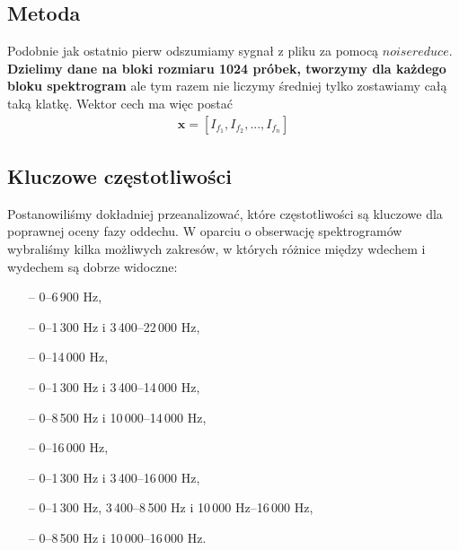 \documentclass[polish]{article}
\begin{document}
\subsection{Metoda}
Podobnie jak ostatnio pierw odszumiamy sygnał z pliku za pomocą $noisereduce$. \textbf{Dzielimy dane na bloki
rozmiaru 1024 próbek, tworzymy dla każdego bloku spektrogram} ale tym razem nie liczymy średniej tylko zostawiamy całą taką klatkę. Wektor cech ma więc postać 
\begin{gather*}
\boldsymbol{x} = [I_{f_1}, I_{f_2}, ..., I_{f_n}]
\end{gather*}
\subsection{Kluczowe częstotliwości}
Postanowiliśmy dokładniej przeanalizować, które częstotliwości są kluczowe dla poprawnej oceny fazy oddechu. W oparciu o obserwację spektrogramów wybraliśmy kilka możliwych zakresów, w których różnice między wdechem i wydechem są dobrze widoczne:
\begin{itemize}
	\setlength\itemsep{-0.25em}
	\item[--] 0--6\,900 \unit{Hz},
	\item[--] 0--1\,300 \unit{Hz} i 3\,400--22\,000 \unit{Hz},
	\item[--] 0--14\,000 \unit{Hz},
	\item[--] 0--1\,300 \unit{Hz} i 3\,400--14\,000 \unit{Hz},
	\item[--] 0--8\,500 \unit{Hz} i 10\,000--14\,000 \unit{Hz},
	\item[--] 0--16\,000 \unit{Hz},
	\item[--] 0--1\,300 \unit{Hz} i 3\,400--16\,000 \unit{Hz},
	\item[--] 0--1\,300 \unit{Hz}, 3\,400--8\,500 \unit{Hz} i 10\,000 \unit{Hz}--16\,000 \unit{Hz},
	\item[--] 0--8\,500 \unit{Hz} i 10\,000--16\,000 \unit{Hz}.
\end{itemize}
\end{document}
